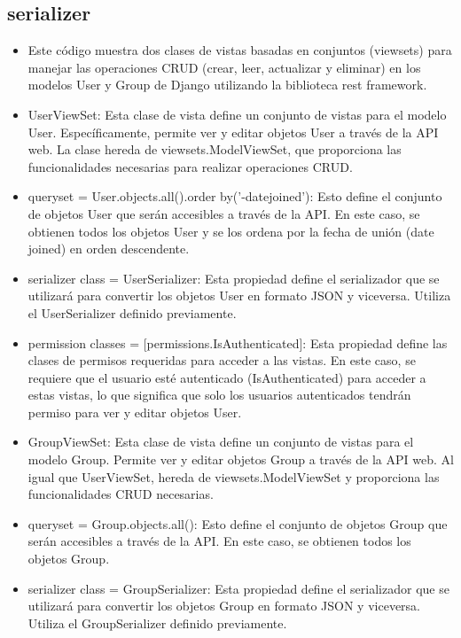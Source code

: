 \documentclass{article}
\begin{document}
\subsection{serializer}
\begin{itemize}	
	\item Este código muestra dos clases de vistas basadas en conjuntos (viewsets) para manejar las operaciones CRUD (crear, leer, actualizar y eliminar) en los modelos User y Group de Django utilizando la biblioteca rest framework.
	\item UserViewSet: Esta clase de vista define un conjunto de vistas para el modelo User. Específicamente, permite ver y editar objetos User a través de la API web. La clase hereda de viewsets.ModelViewSet, que proporciona las funcionalidades necesarias para realizar operaciones CRUD.

\item queryset = User.objects.all().order by('-datejoined'): Esto define el conjunto de objetos User que serán accesibles a través de la API. En este caso, se obtienen todos los objetos User y se los ordena por la fecha de unión (date joined) en orden descendente.

\item serializer class = UserSerializer: Esta propiedad define el serializador que se utilizará para convertir los objetos User en formato JSON y viceversa. Utiliza el UserSerializer definido previamente.

\item permission classes = [permissions.IsAuthenticated]: Esta propiedad define las clases de permisos requeridas para acceder a las vistas. En este caso, se requiere que el usuario esté autenticado (IsAuthenticated) para acceder a estas vistas, lo que significa que solo los usuarios autenticados tendrán permiso para ver y editar objetos User.

\item GroupViewSet: Esta clase de vista define un conjunto de vistas para el modelo Group. Permite ver y editar objetos Group a través de la API web. Al igual que UserViewSet, hereda de viewsets.ModelViewSet y proporciona las funcionalidades CRUD necesarias.

\item queryset = Group.objects.all(): Esto define el conjunto de objetos Group que serán accesibles a través de la API. En este caso, se obtienen todos los objetos Group.

\item serializer class = GroupSerializer: Esta propiedad define el serializador que se utilizará para convertir los objetos Group en formato JSON y viceversa. Utiliza el GroupSerializer definido previamente.


\end{itemize}
\end{document}
